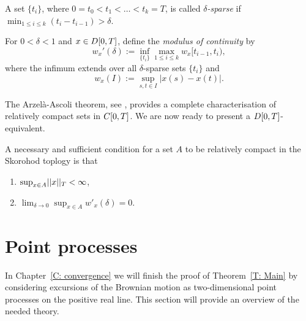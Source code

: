 \begin{definition} \label{D: modulus of continuity}
	A set $\{t_i\}$, where $ 0 = t_0 < t_1 < \dots < t_k = T $,
	is called \emph{$\delta$-sparse} if $\min_{1\leq i \leq k} (t_i - t_{i-1}) > \delta$.
	
	For $0 < \delta < 1$ and $x \in D[0, T]$, define the \emph{modulus of continuity} by
	\begin{equation*}
		w_x'(\delta) := \inf_{\{t_i\}} \max_{1\leq i \leq k} w_x[t_{i-1}, t_i),
	\end{equation*}
	where the infimum extends over all $\delta$-sparse sets $\{t_i\}$ and
	\begin{equation*}
		w_x(I) := \sup_{s,t \in I}|x(s)  -x(t)|.
	\end{equation*}
\end{definition}

The Arzelà-Ascoli theorem, see \cite[Theorem 7.2, p.82]{Billingsley.1999},
provides a complete characterisation of relatively compact sets in $C[0, T]$.
We are now ready to present a $D[0, T]$-equivalent.

\begin{theorem} \label{T: AA in DT}
	A necessary and sufficient condition for a set $A$ to be relatively compact in the Skorohod toplogy is that
	\begin{enumerate}
		\item $\sup_{x \in A} \norm{x}_T < \infty$,
		\item $\lim_{\delta \rightarrow 0} \sup_{x \in A} w'_x(\delta) = 0$.
	\end{enumerate}
\end{theorem}


\section{Point processes} \label{S: point processes}

In Chapter~\ref{C: convergence} we will finish the proof of Theorem~\ref{T: Main}
by considering excursions of the Brownian motion as two-dimensional point processes
on the positive real line.
This section will provide an overview of the needed theory.

